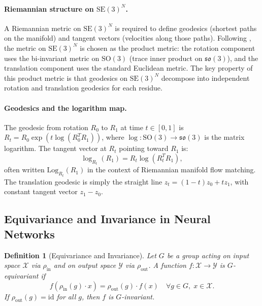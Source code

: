 \documentclass[12pt,a4paper]{article}
\newtheorem{definition}{Definition}[section]
\newcommand{\SE}{\mathrm{SE}(3)}
\newcommand{\SOthree}{\mathrm{SO}(3)}
\begin{document}
\paragraph{Riemannian structure on $\SE^N$.}
A Riemannian metric on $\SE^N$ is required to define geodesics (shortest paths on the manifold)
and tangent vectors (velocities along those paths).  Following \citet{yim2023frameflow}, the
metric on $\SE^N$ is chosen as the product metric: the rotation component uses the bi-invariant
metric on $\SOthree$ (trace inner product on $\mathfrak{so}(3)$), and the translation component
uses the standard Euclidean metric.  The key property of this product metric is that geodesics
on $\SE^N$ decompose into independent rotation and translation geodesics for each residue.

\paragraph{Geodesics and the logarithm map.}
The geodesic from rotation $R_0$ to $R_1$ at time $t \in [0,1]$ is
$R_t = R_0 \exp(t \log(R_0^T R_1))$, where $\log: \SOthree \to \mathfrak{so}(3)$ is the
matrix logarithm.  The tangent vector at $R_t$ pointing toward $R_1$ is:
\begin{equation}
  \log_{R_t}(R_1) = R_t \log(R_t^T R_1),
\end{equation}
often written $\mathrm{Log}_{R_t}(R_1)$ in the context of Riemannian manifold flow matching.
The translation geodesic is simply the straight line $z_t = (1-t)z_0 + t z_1$, with constant
tangent vector $z_1 - z_0$.

\subsection{Equivariance and Invariance in Neural Networks}
\label{sec:equivariance}

\begin{definition}[Equivariance and Invariance]
  Let $G$ be a group acting on input space $\mathcal{X}$ via $\rho_{\mathrm{in}}$ and on output
  space $\mathcal{Y}$ via $\rho_{\mathrm{out}}$.  A function $f: \mathcal{X} \to \mathcal{Y}$ is
  $G$-\emph{equivariant} if
  \begin{equation}
    f(\rho_{\mathrm{in}}(g) \cdot x) = \rho_{\mathrm{out}}(g) \cdot f(x) \quad \forall g \in G,\; x \in \mathcal{X}.
  \end{equation}
  If $\rho_{\mathrm{out}}(g) = \mathrm{id}$ for all $g$, then $f$ is $G$-\emph{invariant}.
\end{definition}
\end{document}
